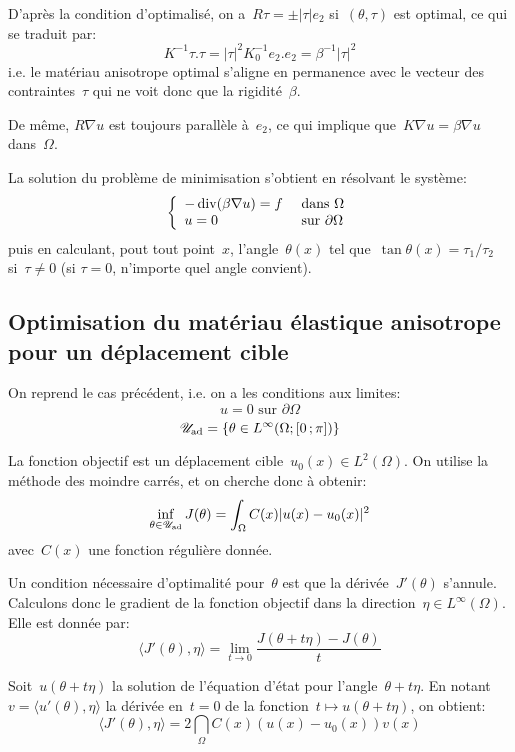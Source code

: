 \medskip
D'après la condition d'optimalisé, on a~$R\tau=\pm|\tau|e_2$ si~$(\theta,\tau)$ est optimal, ce qui se traduit par:
\[ K^{-1}\tau.\tau = |\tau|^2K_0^{-1}e_2.e_2=\beta^{-1}|\tau|^2 \]
i.e. le matériau anisotrope optimal s'aligne en permanence avec le vecteur des contraintes~$\tau$ qui ne voit donc que la rigidité~$\beta$.

De même, $R\nabla u$ est toujours parallèle à~$e_2$, ce qui implique que~$K\nabla u=\beta\nabla u$ dans~$\Omega$.

La solution du problème de minimisation s'obtient en résolvant le système:
\[\left\{\begin{array}{ll} -\operatorname{div}(\beta\nabla u)=f &\text{ dans }\Omega\\ u=0&\text{ sur }\partial\Omega \end{array}\right. \]
puis en calculant, pout tout point~$x$, l'angle~$\theta(x)$ tel que~$\tan\theta(x)=\tau_1/\tau_2$ si~$\tau\ne0$ (si $\tau=0$, n'importe quel angle convient).


\medskip
\subsection{Optimisation du matériau élastique anisotrope pour un déplacement cible}

On reprend le cas précédent, i.e. on a les conditions aux limites:
\[ u=0 \text{ sur }\partial\Omega \]
\[ \mathscr{U}_{\text{ad}}=\{\theta\in L^\infty(\Omega;\mathopen{[}0\,;\pi\mathclose{]}) \} \]

La fonction objectif est un déplacement cible~$u_0(x)\in L^2(\Omega)$. On utilise la méthode des moindre carrés, et on cherche donc à obtenir:
\[ \colorblue \inf_{\theta\in\mathscr{U}_{\text{ad}}} J(\theta)=\dint_\Omega C(x)|u(x)-u_0(x)|^2 \]
avec~$C(x)$ une fonction régulière donnée.

\medskip
Un condition nécessaire d'optimalité pour~$\theta$ est que la dérivée~$J'(\theta)$ s'annule.
Calculons donc le gradient de la fonction objectif dans la direction~$\eta\in L^\infty(\Omega)$. Elle est donnée par:
\[ \langle J'(\theta),\eta\rangle = \lim_{t\rightarrow0} \dfrac{J(\theta+t\eta)-J(\theta)}{t} \]

Soit~$u(\theta+t\eta)$ la solution de l'équation d'état pour l'angle~$\theta+t\eta$. En notant~$v=\langle u'(\theta),\eta\rangle$ la dérivée en~$t=0$ de la fonction~$t \mapsto u(\theta+t\eta)$, on obtient:
\[ \langle J'(\theta),\eta\rangle = 2\dint_\Omega C(x)(u(x)-u_0(x))v(x) \]

